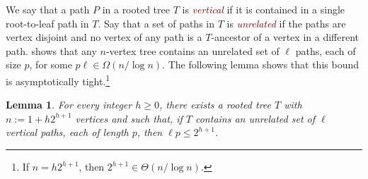 \documentclass[12pt]{article}
\newcommand{\defn}[1]{\textcolor{Maroon}{\emph{#1}}}
\DeclarePairedDelimiter{\floor}{\lfloor}{\rfloor}
\renewcommand{\ge}{\geqslant}
\renewcommand{\le}{\leqslant}
\theoremstyle{plain}
\newtheorem{lem}[thm]{Lemma}
\theoremstyle{definition}
\begin{document}




We say that a path $P$ in a rooted tree $T$ is \defn{vertical} if it is contained in a single root-to-leaf path in $T$.  Say that a set of paths in $T$ is \defn{unrelated} if the paths are vertex disjoint and no vertex of any path is a $T$-ancestor of a vertex in a different path.     shows that any $n$-vertex tree contains an unrelated set of $\ell$ paths, each of size $p$, for some $p\ell \in\Omega(n/\log n)$.  The following lemma shows that this bound is asymptotically tight.\footnote{If $n=h2^{h+1}$, then $2^{h+1}\in \Theta(n/\log n)$.}  

\begin{lem}\label{pl_upper_bound}
    For every integer $h\ge 0$, there exists a rooted tree $T$ with $n:=1+h2^{h+1}$ vertices and such that, if $T$ contains an unrelated set of $\ell$ vertical paths, each of length $p$, then $\ell p\le 2^{h+1}$. 
\end{lem}
\end{document}
